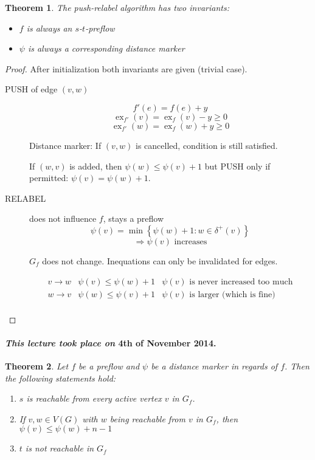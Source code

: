 \documentclass{article}
\newtheorem{theorem}{Theorem}
\newcommand{\set}[1]{\left\{#1\right\}}
\newcommand{\dateref}[1]{\paragraph{\textit{This lecture took place on} #1.}}
\begin{document}
\begin{theorem}\label{proposition-4.8}
  The push-relabel algorithm has two invariants:
  \begin{itemize}
    \item $f$ is always an $s$-$t$-preflow
    \item $\psi$ is always a corresponding distance marker
  \end{itemize}
\end{theorem}

\begin{proof}
  After initialization both invariants are given (trivial case).

  \begin{description}
    \item[PUSH of edge $(v, w)$]
      \[ f'(e) = f(e) + y \]
      \[ \operatorname{ex}_{f'}(v) = \operatorname{ex}_f(v) - y \geq 0 \]
      \[ \operatorname{ex}_{f'}(w) = \operatorname{ex}_f(w) + y \geq 0 \]

      Distance marker: If $(v, w)$ is cancelled, condition is still satisfied.

      If $(w, v)$ is added, then $\psi(w) \leq \psi(v) + 1$ but PUSH only if permitted:
      $\psi(v) = \psi(w) + 1$.

    \item[RELABEL] does not influence $f$, stays a preflow
      \[ \psi(v) = \min\set{\psi(w) + 1: w \in \delta^+(v)} \]
      \[ \Rightarrow \psi(v) \text{ increases} \]

      $G_f$ does not change. Inequations can only be invalidated for edges.

      \[
        \begin{array}{lll}
          v \rightarrow w & \psi(v) \leq \psi(w) + 1 & \text{$\psi(v)$ is never increased too much} \\
          w \rightarrow v & \psi(w) \leq \psi(v) + 1 & \text{$\psi(v)$ is larger (which is fine)} \\
        \end{array}
      \]
  \end{description}
\end{proof}

\dateref{4th of November 2014}

\begin{theorem}\label{lemma-4.9}
  Let $f$ be a preflow and $\psi$ be a distance marker in regards of $f$. Then the following statements hold:
  \begin{enumerate}
    \item $s$ is reachable from every active vertex $v$ in $G_f$.
    \item If $v, w \in V(G)$ with $w$ being reachable from $v$ in $G_f$,
          then $\psi(v) \leq \psi(w) + n - 1$
    \item $t$ is not reachable in $G_f$
  \end{enumerate}
\end{theorem}
\end{document}
